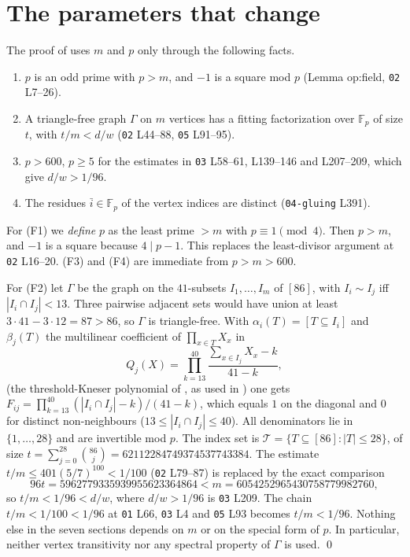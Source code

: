 \documentclass[11pt]{amsart}
\theoremstyle{remark}
\newcommand{\F}{\mathbb F}
\begin{document}
\section{The parameters that change}
The proof of \cite{OAI197} uses $m$ and $p$ only through the following facts.
\begin{enumerate}
\item[(F1)] $p$ is an odd prime with $p>m$, and $-1$ is a square mod $p$ (Lemma op:field, \texttt{02} L7--26).
\item[(F2)] A triangle-free graph $\Gamma$ on $m$ vertices has a fitting factorization over $\F_p$ of size
$t$, with $t/m<d/w$ (\texttt{02} L44--88, \texttt{05} L91--95).
\item[(F3)] $p>600$, $p\ge5$ for the estimates in \texttt{03} L58--61, L139--146 and L207--209, which give $d/w>1/96$.
\item[(F4)] The residues $\bar i\in\F_p$ of the vertex indices are distinct (\texttt{04-gluing} L391).
\end{enumerate}
For (F1) we \emph{define} $p$ as the least prime $>m$ with $p\equiv1\pmod4$. Then $p>m$, and $-1$
is a square because $4\mid p-1$. This replaces the least-divisor argument at \texttt{02} L16--20.
(F3) and (F4) are immediate from $p>m>600$.

For (F2) let $\Gamma$ be the graph on the $41$-subsets $I_1,\dots,I_m$ of $[86]$, with $I_i\sim I_j$ iff
$|I_i\cap I_j|<13$. Three pairwise adjacent sets would have union at least
$3\cdot41-3\cdot12=87>86$, so $\Gamma$ is triangle-free. With
$\alpha_i(T)=[T\subseteq I_i]$ and $\beta_j(T)$ the multilinear coefficient of $\prod_{x\in T}X_x$ in
\[
Q_j(X)=\prod_{k=13}^{40}\frac{\sum_{x\in I_j}X_x-k}{41-k},
\]
(the threshold-Kneser polynomial of \cite{Hav,GH}, as used in \cite{OAI197}) one gets $F_{ij}=\prod_{k=13}^{40}(|I_i\cap I_j|-k)/(41-k)$, which equals $1$ on the diagonal and
$0$ for distinct non-neighbours ($13\le|I_i\cap I_j|\le40$). All denominators lie in $\{1,\dots,28\}$ and are
invertible mod $p$. The index set is $\mathcal T=\{T\subseteq[86]:|T|\le28\}$, of size
$t=\sum_{j=0}^{28}\binom{86}{j}=62112284749374537743384$. The estimate
$t/m\le 401(5/7)^{100}<1/100$ (\texttt{02} L79--87) is replaced by the exact comparison
\[
96t=5962779335939955623364864<m=6054252965430758779982760,
\]
so $t/m<1/96<d/w$, where $d/w>1/96$ is \texttt{03} L209. The chain $t/m<1/100<1/96$ at
\texttt{01} L66, \texttt{03} L4 and \texttt{05} L93 becomes $t/m<1/96$. Nothing else in the seven
sections depends on $m$ or on the special form of $p$. In particular, neither vertex transitivity nor
any spectral property of $\Gamma$ is used. \qed
\end{document}
